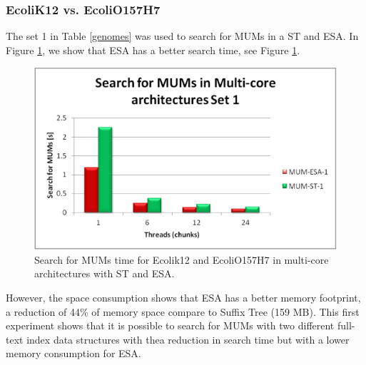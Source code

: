 \documentclass[runningheads,a5paper]{llncs}
\begin{document}
\subsubsection{EcoliK12 vs. EcoliO157H7}
The set 1 in Table \ref{genomes} was used to search for MUMs in a ST and ESA. In Figure \ref{fig:ecoli-mum}, we show that ESA has a better search time, see Figure \ref{fig:ecoli-mum}.
 \begin{figure}[!h]
  \centering
  \includegraphics[scale=0.3]{ecoli-MUM.eps}
  \caption{Search for MUMs time for Ecolik12 and EcoliO157H7 in multi-core architectures with ST and ESA.}
  \label{fig:ecoli-mum}
\end{figure}  
However, the space consumption shows that ESA has a better memory footprint, a reduction of 44\% of memory space compare to Suffix Tree (159 MB).
This first experiment shows that it is possible to search for MUMs with two different full-text index data structures with thea reduction in search time but with a lower memory consumption for ESA.
\end{document}
